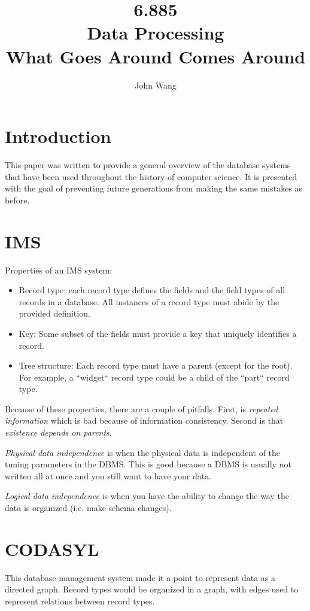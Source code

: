 \documentclass[psamsfonts]{amsart}
\title{6.885 \\
Data Processing \\
What Goes Around Comes Around}
\author{John Wang}
\begin{document}
\maketitle

\section{Introduction}

This paper was written to provide a general overview of the database systems that have been used throughout the history of computer science. It is presented with the goal of preventing future generations from making the same mistakes as before.

\section{IMS}

Properties of an IMS system:
\begin{itemize}
  \item Record type: each record type defines the fields and the field types of all records in a database. All instances of a record type must abide by the provided definition.
  \item Key: Some subset of the fields must provide a key that uniquely identifies a record.
  \item Tree structure: Each record type must have a parent (except for the root). For example, a ``widget`` record type could be a child of the ``part`` record type.
\end{itemize}

Because of these properties, there are a couple of pitfalls. First, is \emph{repeated information} which is bad because of information consistency. Second is that \emph{existence depends on parents}.

\emph{Physical data independence} is when the physical data is independent of the tuning parameters in the DBMS. This is good because a DBMS is usually not written all at once and you still want to have your data.

\emph{Logical data independence} is when you have the ability to change the way the data is organized (i.e. make schema changes).

\section{CODASYL}

This database management system made it a point to represent data as a directed graph. Record types would be organized in a graph, with edges used to represent relations between record types. 
\end{document}
